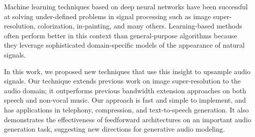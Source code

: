 \documentclass{article} \usepackage{iclr2017_workshop,times}
\begin{document}
Machine learning techniques based on deep neural networks have been successful at solving under-defined problems in signal processing such as image super-resolution, colorization, in-painting, and many others. 
Learning-based methods often perform better in this context than general-purpose algorithms because they leverage sophisticated domain-specific models of the appearance of natural signals.

In this work, we proposed new techniques that use this insight to upsample audio signals. Our technique extends previous work on image super-resolution to the audio domain; it outperforms previous bandwidth extension approaches on both speech and non-vocal music. Our approach is fast and simple to implement, and has applications in telephony, compression, and text-to-speech generation. It also demonstrates the effectiveness of feedforward architectures on an important audio generation task, suggesting new directions for generative audio modeling.







\end{document}
